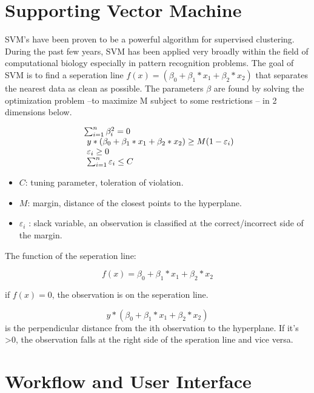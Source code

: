 \documentclass[10pt,letterpaper]{article}
\providecommand{\tightlist}{%
  \setlength{\itemsep}{0pt}\setlength{\parskip}{0pt}}
\begin{document}
\section{Supporting Vector Machine}\label{supporting-vector-machine}

SVM's have been proven to be a powerful algorithm for supervised
clustering. During the past few years, SVM has been applied very broadly
within the field of computational biology especially in pattern
recognition problems. The goal of SVM is to find a seperation line
\(f(x) = (\beta_0 + \beta_1 * x_1 + \beta_2 * x_2)\) that separates the
nearest data as clean as possible. The parameters \(\beta\) are found by
solving the optimization problem --to maximize M subject to some
restrictions -- in 2 dimensions below.

\begin{equation}
  \left.
  \begin{array}{l@{\,}l}
     \sum_{i=1}^n \beta_i^2 = 0 \\
     \ y * ( \beta_0 + \beta_1 * x_1 + \beta_2 * x_2 ) \geq M(1-\varepsilon_i) \\
     \ \varepsilon_i \geq 0 \\
     \ \sum_{i=1}^n \varepsilon_i \leq C \\
  \end{array}
  \right.
\end{equation}

\begin{itemize}
\tightlist
\item
  \(C\): tuning parameter, toleration of violation.
\item
  \(M\): margin, distance of the closest points to the hyperplane.
\item
  \(\varepsilon_i\) : slack variable, an observation is classified at
  the correct/incorrect side of the margin.
\end{itemize}

The function of the seperation line:

\[f(x) = \beta_0 + \beta_1 * x_1 + \beta_2 * x_2 \]

if \(f(x) = 0\), the observation is on the seperation line.

\[ y * ( \beta_0 + \beta_1 * x_1 + \beta_2 * x_2 )\] is the
perpendicular distance from the ith observation to the hyperplane. If
it's \textgreater{}0, the observation falls at the right side of the
speration line and vice versa.

\section{Workflow and User Interface}\label{workflow-and-user-interface}
\end{document}
